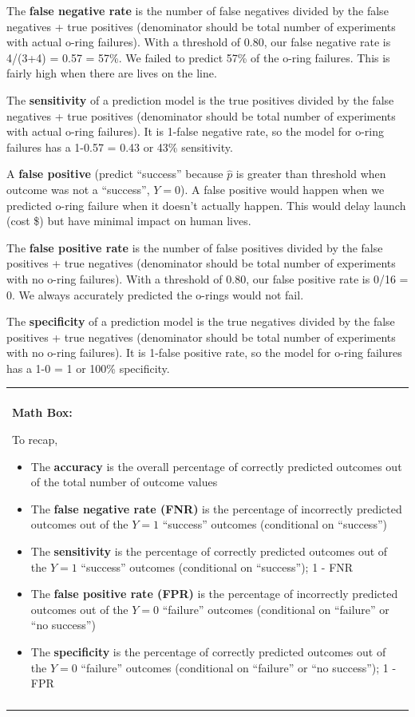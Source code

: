 \documentclass[
]{book}
\newenvironment{mathbox}
{
    \begin{center}
    
    \begin{tabular}{|p{0.8\textwidth}|}
    \rowcolor{LightYellow}
    \hline\\
    \rowcolor{LightYellow}
    \textbf{Math Box:}
}
{
    \\\rowcolor{LightYellow}
    \\\hline
    \end{tabular} 
    \end{center}
}
\begin{document}
The \textbf{false negative rate} is the number of false negatives divided by the false negatives + true positives (denominator should be total number of experiments with actual o-ring failures). With a threshold of 0.80, our false negative rate is 4/(3+4) = 0.57 = 57\%. We failed to predict 57\% of the o-ring failures. This is fairly high when there are lives on the line.

The \textbf{sensitivity} of a prediction model is the true positives divided by the false negatives + true positives (denominator should be total number of experiments with actual o-ring failures). It is 1-false negative rate, so the model for o-ring failures has a 1-0.57 = 0.43 or 43\% sensitivity.

A \textbf{false positive} (predict ``success'' because \(\hat{p}\) is greater than threshold when outcome was not a ``success'', \(Y=0\)). A false positive would happen when we predicted o-ring failure when it doesn't actually happen. This would delay launch (cost \$) but have minimal impact on human lives.

The \textbf{false positive rate} is the number of false positives divided by the false positives + true negatives (denominator should be total number of experiments with no o-ring failures). With a threshold of 0.80, our false positive rate is 0/16 = 0. We always accurately predicted the o-rings would not fail.

The \textbf{specificity} of a prediction model is the true negatives divided by the false positives + true negatives (denominator should be total number of experiments with no o-ring failures). It is 1-false positive rate, so the model for o-ring failures has a 1-0 = 1 or 100\% specificity.

\begin{mathbox}
To recap,

\begin{itemize}
\item
  The \textbf{accuracy} is the overall percentage of correctly predicted
  outcomes out of the total number of outcome values
\item
  The \textbf{false negative rate (FNR)} is the percentage of
  incorrectly predicted outcomes out of the \(Y=1\) ``success'' outcomes
  (conditional on ``success'')
\item
  The \textbf{sensitivity} is the percentage of correctly predicted
  outcomes out of the \(Y=1\) ``success'' outcomes (conditional on
  ``success''); 1 - FNR
\item
  The \textbf{false positive rate (FPR)} is the percentage of
  incorrectly predicted outcomes out of the \(Y=0\) ``failure'' outcomes
  (conditional on ``failure'' or ``no success'')
\item
  The \textbf{specificity} is the percentage of correctly predicted
  outcomes out of the \(Y=0\) ``failure'' outcomes (conditional on
  ``failure'' or ``no success''); 1 - FPR
\end{itemize}
\end{mathbox}
\end{document}

